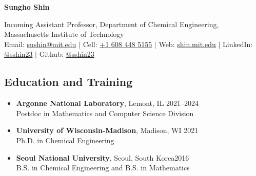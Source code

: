 \documentclass[letterpaper, 11pt]{article}
\begin{document}
\thispagestyle{empty}
\begin{center}
  {\bf\Large Sungho Shin}
\end{center}
\begin{center}
  {Incoming Assistant Professor}, Department of Chemical Engineering, {Massachusetts Institute of Technology}\\
  Email: \href{mailto:sushin@mit.edu}{sushin@mit.edu} $|$ Cell: \href{tel:16084485155}{+1 608 448 5155} $|$ Web: \href{https://shin.mit.edu}{shin.mit.edu} $|$ LinkedIn: \href{https://www.linkedin.com/in/sshin23/}{@sshin23} $|$ Github: \href{https://github.com/sshin23}{@sshin23}
\end{center}


\subsection*{Education and Training}
\begin{itemize}[itemsep=1pt, parsep=0pt,leftmargin=*]
\item[]
  {\bf Argonne National Laboratory}, Lemont, IL \hfill 2021--2024\\
  {Postdoc in Mathematics and Computer Science Division}
\item[]
  {\bf University of Wisconsin-Madison}, Madison, WI \hfill 2021\\
  {Ph.D. in Chemical Engineering}
\item[]
  {\bf Seoul National University}, Seoul, South Korea\hfill 2016 \\
  {B.S. in Chemical Engineering} and {B.S. in Mathematics}
\end{itemize}

\end{document}
